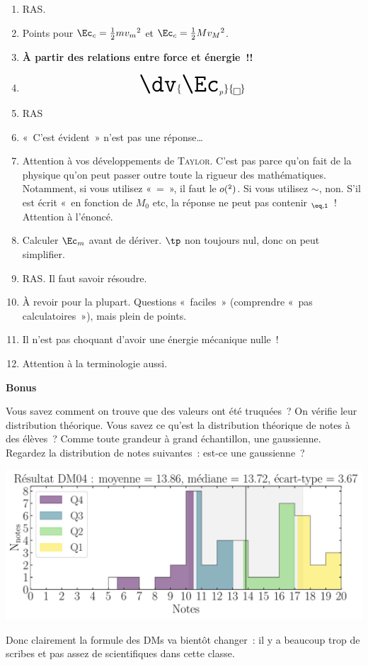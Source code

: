 \documentclass[a4paper, 10pt, final, garamond]{book}
\begin{document}
\begin{enumerate}
    \item RAS.
    \item Points pour $\Ec_c = \frac{1}{2}mv_m{}^2$ et $\Ec_c =
        \frac{1}{2}Mv_M{}^2$.
    \item \textbf{À partir des relations entre force et énergie~!!}
    \item 
        \[\Huge \dv{\Ec_p}{\boxed{\tt}}\]
    \item RAS
    \item «~C'est évident~» n'est pas une réponse…
    \item Attention à vos développements de \textsc{Taylor}. C'est pas parce
        qu'on fait de la physique qu'on peut passer outre toute la rigueur des
        mathématiques. Notamment, si vous utilisez «~=~», il faut le $o(\tt^2)$.
        Si vous utilisez $\sim$, non. S'il est écrit «~en fonction de $M_0$ etc,
        la réponse ne peut pas contenir $\tt_{\eq,1}$~! Attention à l'énoncé.
    \item Calculer $\Ec_m$ avant de dériver. $\tp$ non toujours nul, donc on
        peut simplifier.
    \item RAS. Il faut savoir résoudre.
    \item À revoir pour la plupart. Questions «~faciles~» (comprendre «~pas
        calculatoires~»), mais plein de points.
    \item Il n'est pas choquant d'avoir une énergie mécanique nulle~!
    \item Attention à la terminologie aussi.
\end{enumerate}

\begin{center}
    \bfseries\Large
    Bonus
\end{center}

Vous savez comment on trouve que des valeurs ont été truquées~? On vérifie leur
distribution théorique. Vous savez ce qu'est la distribution théorique de notes
à des élèves~? Comme toute grandeur à grand échantillon, une gaussienne.
Regardez la distribution de notes suivantes~: est-ce une gaussienne~?

\begin{center}
    \includegraphics[width=.8\linewidth]{res_DM04.pdf}
\end{center}

Donc clairement la formule des DMs va bientôt changer~: il y a beaucoup trop de
scribes et pas assez de scientifiques dans cette classe.
\end{document}
